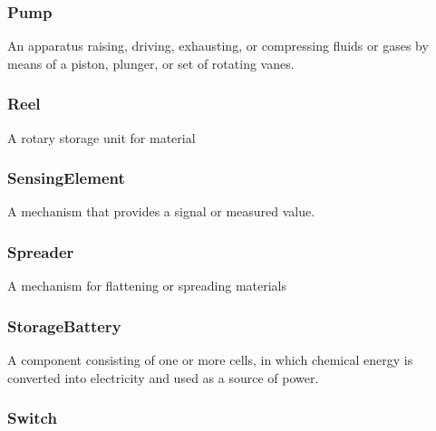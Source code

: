 \subsubsection{Pump}
  \label{sec:Pump}



An apparatus raising, driving, exhausting, or compressing fluids or gases by means of a piston, plunger, or set of rotating vanes.

\FloatBarrier

\subsubsection{Reel}
  \label{sec:Reel}



A rotary storage unit for material

\FloatBarrier

\subsubsection{SensingElement}
  \label{sec:SensingElement}



A mechanism that provides a signal or measured value.

\FloatBarrier

\subsubsection{Spreader}
  \label{sec:Spreader}



A mechanism for flattening or spreading materials

\FloatBarrier

\subsubsection{StorageBattery}
  \label{sec:StorageBattery}



A component consisting of one or more cells, in which chemical energy is converted into electricity and used as a source of power. 

\FloatBarrier

\subsubsection{Switch}
  \label{sec:Switch}



